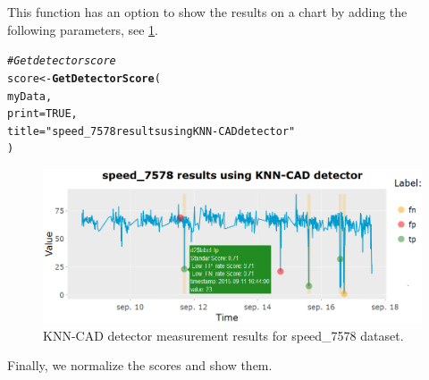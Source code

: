 \documentclass[a4paper]{article}\usepackage[]{graphicx}\usepackage[]{color}
\makeatletter
\newcommand{\hlnum}[1]{\textcolor[rgb]{0.686,0.059,0.569}{#1}}%
\newcommand{\hlstr}[1]{\textcolor[rgb]{0.192,0.494,0.8}{#1}}%
\newcommand{\hlcom}[1]{\textcolor[rgb]{0.678,0.584,0.686}{\textit{#1}}}%
\newcommand{\hlstd}[1]{\textcolor[rgb]{0.345,0.345,0.345}{#1}}%
\newcommand{\hlkwb}[1]{\textcolor[rgb]{0.69,0.353,0.396}{#1}}%
\newcommand{\hlkwc}[1]{\textcolor[rgb]{0.333,0.667,0.333}{#1}}%
\newcommand{\hlkwd}[1]{\textcolor[rgb]{0.737,0.353,0.396}{\textbf{#1}}}%
\newenvironment{kframe}{%
 \def\at@end@of@kframe{}%
 \ifinner\ifhmode%
  \def\at@end@of@kframe{\end{minipage}}%
  \begin{minipage}{\columnwidth}%
 \fi\fi%
 \def\FrameCommand##1{\hskip\@totalleftmargin \hskip-\fboxsep
 \colorbox{shadecolor}{##1}\hskip-\fboxsep
     \hskip-\linewidth \hskip-\@totalleftmargin \hskip\columnwidth}%
 \MakeFramed {\advance\hsize-\width
   \@totalleftmargin\z@ \linewidth\hsize
   \@setminipage}}%
 {\par\unskip\endMakeFramed%
 \at@end@of@kframe}
\newenvironment{knitrout}{}{} %
\makeatother
\begin{document}
  This function has an option to show the results on a chart by adding the following parameters, see \ref{fig:Ej1ScoreDe}.

\begin{knitrout}
\color{fgcolor}\begin{kframe}
\begin{alltt}
\hlcom{# Get detector score}
\hlstd{score} \hlkwb{<-} \hlkwd{GetDetectorScore}\hlstd{(}
  \hlstd{myData,}
  \hlkwc{print} \hlstd{=} \hlnum{TRUE}\hlstd{,}
  \hlkwc{title} \hlstd{=} \hlstr{"speed_7578 results using KNN-CAD detector"}
\hlstd{)}
\end{alltt}
\end{kframe}
\end{knitrout}

  \begin{figure}[htbp]
  \centering
  \includegraphics[width=1\linewidth]{Ej1ScoreDe.png}
  \caption{KNN-CAD detector measurement results for speed\_7578 dataset.}
  \label{fig:Ej1ScoreDe}
  \end{figure}

  Finally, we normalize the scores and show them.
\end{document}
